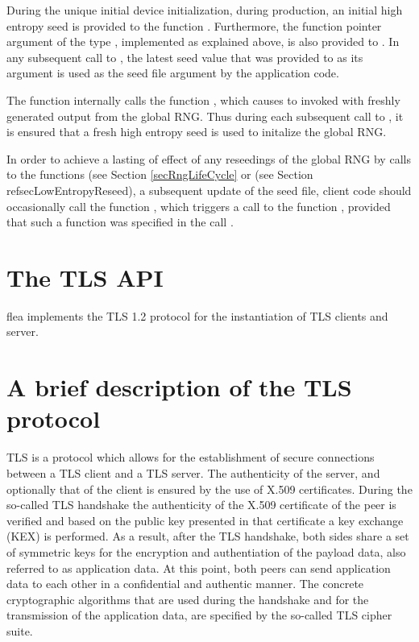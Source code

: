 \documentclass[a4paper,11pt]{scrartcl}
\begin{document}
During the unique initial device initialization, \eg
during production, an initial high entropy seed is provided to the
function \funcLibInit. Furthermore, the function pointer argument of the type
\funcSaveRngState, implemented as explained above, is also provided to
\funcLibInit. In any subsequent call to \funcLibInit, the latest seed value that was
provided to \funcSaveRngState as its argument is used as the seed file argument
by the application code.

The function \funcLibInit internally calls the function
, which causes \funcSaveRngState to
invoked with freshly generated output from the global RNG. Thus during each
subsequent call to \funcLibInit, it is ensured that a fresh high entropy seed is
used to initalize the global RNG.

In order to achieve a lasting of effect of any reseedings of the global RNG
by calls to the functions   (see
Section \ref{secRngLifeCycle} or
 (see Section
ref{secLowEntropyReseed}), \ie a subsequent update of the seed file, client code
should occasionally call the function
, which triggers a call to the
function \funcSaveRngState, provided that such a function was specified in the
call \funcLibInit.

\section{The TLS API}

flea implements the TLS 1.2 protocol for the instantiation of TLS clients and
server. 

\section{A brief description of the TLS protocol}
TLS is a protocol which allows for the establishment of secure connections
between a TLS client and a TLS server. The authenticity of the server, and
optionally that of the client is ensured by the use of X.509 certificates.
During the so-called TLS handshake the authenticity of the X.509 certificate of
the peer is verified and based on the public key presented in that certificate
a key exchange (KEX) is performed. As a result, after the TLS handshake, both
sides share a set of symmetric keys for the encryption and authentiation of the
payload data, also referred to as application data. 
At this point, both peers
can send application data to each other in a confidential and authentic manner.
The concrete cryptographic algorithms that are used during the handshake and for the
transmission of the application data, are specified by the so-called TLS
cipher suite.
\end{document}

